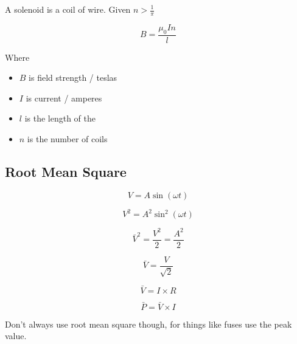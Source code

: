 \documentclass{article}
\begin{document}
A solenoid is a coil of wire. Given $n>\frac{1}{\pi}$

\[B=\frac{\mu_0In}{l}\] %

\noindent Where\begin{itemize}

    \item $B$ is field strength / teslas
    \item $I$ is current / amperes
    \item $l$ is the length of the 
    \item $n$ is the number of coils

\end{itemize}

\subsection{Root Mean Square}

\[V = A \sin \left(\omega t\right)\]

\[V^2 = A^2 \sin^2 \left(\omega t\right)\]

\[\bar{V}^2 = \frac{V^2}{2} = \frac{A^2}{2}\]

\[\bar{V} = \frac{V}{\sqrt{2}}\]


\[\bar{V} = I \times R\]

\[\bar{P} = \bar{V} \times I\]

Don't always use root mean square though, for things like fuses use the peak
value.
\end{document}
